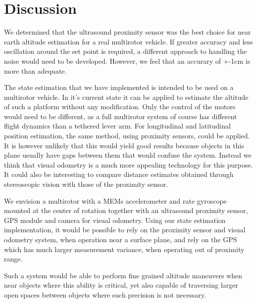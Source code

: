 \section{Discussion}\label{sec:discussion}
We determined that the ultrasound proximity sensor was the best choice for near earth altitude estimation for a real multirotor 
vehicle. If greater accuracy and less oscillation around the set point is required, a different approach to handling the noise would
need to be developed. However, we feel that an accurary of +-1cm is more than adequate.

The state estimation that we have implemented is intended to be used on a multirotor vehicle. In it's current state it can be applied
to estimate the altitude of such a platform without any modification. Only the control of the motors would need to be different, as 
a full multirotor system 
of course has different flight dynamics than a tethered lever arm. For longitudinal and latitudinal position estimation, the same method,
using proximity sensors, could be applied. It is however unlikely that this would yield good results because objects in this plane usually
have gaps between them that would confuse the system. Instead we think that visual odometry\cite{Nister2004} is a much more
appealing technology for this
purpose. It could also be interesting to compare distance estimates obtained through stereoscopic vision with those of the proximity sensor.

We envision a multirotor with a MEMs accelerometer and rate gyroscope
mounted at the center of rotation together with an ultrasound proximity sensor, GPS module and camera for visual odometry.
Using our state estimation implementation,
it would be possible to rely on the proximity sensor and visual odometry system, when operation near a surface plane, and rely
on the GPS which has much larger 
measurement variance, when operating out of proximity range.

Such a system would be able to perform fine grained altitude maneuvers when near objects where this ability is critical, yet also capable
of traversing larger open spaces between objects where such precision is not necessary.
